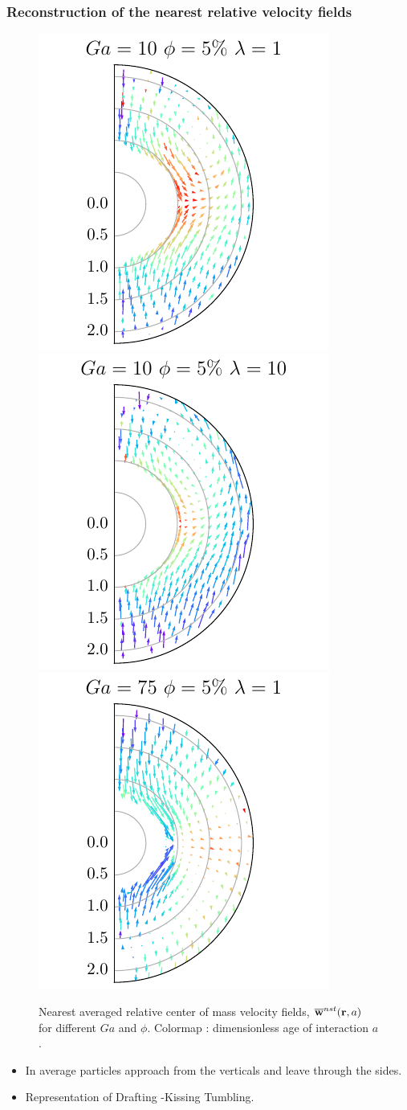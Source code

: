 \documentclass{sintefbeamer}
\begin{document}
\begin{frame}
  \frametitle{Reconstruction of the nearest relative velocity fields}

  \begin{figure}
    
    \includegraphics[height=0.35\textwidth]{image/HOMOGENEOUS/fDrop/U_rel_l_1_Ga_10_PHI_5.pdf}
    \includegraphics[height=0.35\textwidth]{image/HOMOGENEOUS/fDrop/U_rel_l_10_Ga_10_PHI_5.pdf}
    \includegraphics[height=0.35\textwidth]{image/HOMOGENEOUS/fDrop/U_rel_l_1_Ga_75_PHI_5.pdf}
    
    \caption{Nearest averaged relative center of mass velocity fields, $\overline{\textbf{w}}^{nst} (\textbf{r},a)$ for different $Ga$ and $\phi$. 
    Colormap : dimensionless age of interaction $a$. }
  \end{figure}

\begin{itemize}
  \item In average particles approach from the verticals and leave through the sides. 
  \item Representation of Drafting -Kissing Tumbling. 
\end{itemize}
\end{frame}
\end{document}
